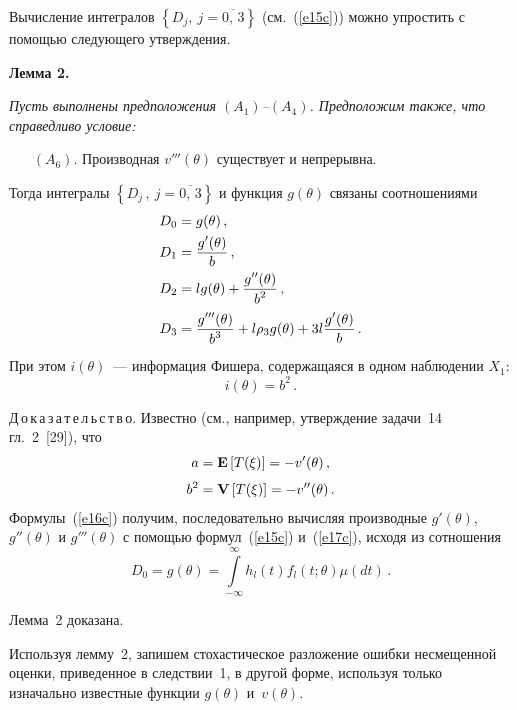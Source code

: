 \begin{multicols}{2}
   \noindent
   Вычисление интегралов $\left\{D_j,~j=\overline{0,\,3} \right\}$
   (см.~(\ref{e15c})) можно упростить с помощью следующего утверждения.

\medskip

\noindent
{\bf Лемма 2.} {\it Пусть выполнены предположения
  $(A_1)$--$(A_4)$. Предположим также, что справедливо условие:
{\addtolength{\leftmargini}{10pt}
  \begin{itemize}
  \item [\sffamily $(A_6).$] Производная $v'''(\theta)$ существует и непрерывна.
  \end{itemize}}
   Тогда интегралы $\left\{D_j\,,~j=\overline{0,\,3} \right\}$ и функция
  $g(\theta)$ связаны соотношениями
\begin{align} 
D_0&=g(\theta)\,,\notag\\
D_1&=\displaystyle\frac{\displaystyle g'(\theta)\mathstrut}{\displaystyle b\mathstrut}\,,\notag\\[-9pt]
&\label{e16c}\\[-9pt]
D_2&=l g(\theta)+\displaystyle\frac{\displaystyle g''(\theta)\mathstrut}{\displaystyle b^2\mathstrut}\,,\notag\\
D_3&=\displaystyle\frac{\displaystyle g'''(\theta)\mathstrut}{\displaystyle b^3\mathstrut}+l\rho_3 g(\theta)+
     3l\displaystyle\frac{\displaystyle g'(\theta)\mathstrut}{\displaystyle b\mathstrut}\,.\notag
\end{align}
  При этом $i(\theta)$~--- информация Фишера, содержащаяся в одном
  наблюдении $X_1$: 
  $$
  i(\theta)=b^2\,.
  $$
   }


\noindent
Д\,о\,к\,а\,з\,а\,т\,е\,л\,ь\,с\,т\,в\,о. 
Известно (см., например, утверждение
  задачи~14 гл.~2~[29]), что
  \begin{align}
 a&={\bf E}\left[T(\xi) \right]=-v'(\theta)\,,\notag\\[-6pt]
 & \label{e17c}\\[-6pt]
      b^2&={\bf V}\left[T(\xi) \right]=-v''(\theta)\,.\notag
\end{align}
  Формулы~(\ref{e16c}) получим, последовательно вычисляя производные
  $g'(\theta)$, $g''(\theta)$ и $g'''(\theta)$ с помощью формул~(\ref{e15c}) 
и~(\ref{e17c}), исходя из сотношения
  $$ 
D_0=g(\theta)=\int\limits_{-\infty}^\infty
         h_l(t) f_l(t;\theta) \mu(dt)\,.
  $$

  Лемма~2 доказана.
\smallskip

  Используя лемму~2, запишем стохастическое разложение ошибки несмещенной
  оценки, приведенное в следствии~1, в другой форме,
  используя только изначально известные функции
  $g(\theta)$ и~$v(\theta)$.
  {
  
  }


\end{multicols}
